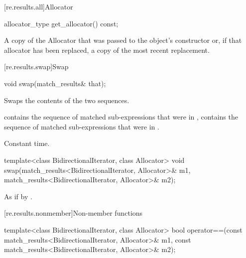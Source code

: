 [re.results.all]{Allocator}%

%
\begin{itemdecl}
allocator_type get_allocator() const;
\end{itemdecl}

\begin{itemdescr}
\pnum
\returns
A copy of the Allocator that was passed to the object's constructor or, if that
allocator has been replaced, a copy of the most recent replacement.
\end{itemdescr}

[re.results.swap]{Swap}

%
\begin{itemdecl}
void swap(match_results& that);
\end{itemdecl}

\begin{itemdescr}
\pnum
\effects
Swaps the contents of the two sequences.

\pnum
\ensures
{} contains the sequence of matched
sub-expressions that were in ,  contains the
sequence of matched sub-expressions that were in .

\pnum
\complexity
Constant time.
\end{itemdescr}

%
\begin{itemdecl}
template<class BidirectionalIterator, class Allocator>
  void swap(match_results<BidirectionalIterator, Allocator>& m1,
            match_results<BidirectionalIterator, Allocator>& m2);
\end{itemdecl}

\pnum
\effects
As if by .

[re.results.nonmember]{Non-member functions}

%
\begin{itemdecl}
template<class BidirectionalIterator, class Allocator>
bool operator==(const match_results<BidirectionalIterator, Allocator>& m1,
                const match_results<BidirectionalIterator, Allocator>& m2);
\end{itemdecl}

